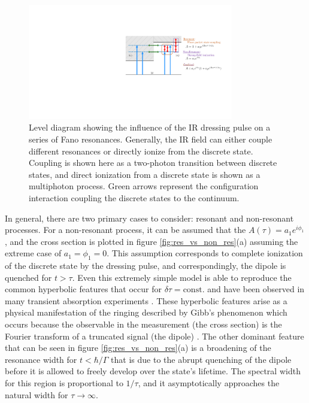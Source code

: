 \begin{figure}
	\centering
	\includegraphics[width=0.8\textwidth]{figures/ATS/level_diagram_dressing_3.pdf}
	\caption[Level diagram showing the influence of the IR dressing pulse on a series of Fano resonances]{Level diagram showing the influence of the IR dressing pulse on a series of Fano resonances. Generally, the IR field can either couple different resonances or directly ionize from the discrete state. Coupling is shown here as a two-photon transition between discrete states, and direct ionization from a discrete state is shown as a multiphoton process.  Green arrows represent the configuration interaction coupling the discrete states to the continuum.}
	\label{fig:level_diagram_dressing}
\end{figure}

In general, there are two primary cases to consider: resonant and non-resonant processes. For a non-resonant process, it can be assumed that the $A(\tau)=a_1e^{i\phi_1}$, and the cross section is plotted in figure \ref{fig:res_vs_non_res}(a) assuming the extreme case of $a_1=\phi_1=0$.  This assumption corresponds to complete ionization of the discrete state by the dressing pulse, and correspondingly, the dipole is quenched for $t>\tau$.  Even this extremely simple model is able to reproduce the common hyperbolic features that occur for $\delta\tau=\mathrm{const.}$ and have been observed in many transient absorption experiments \cite{wangAttosecondTimeResolvedAutoionization2010, ottReconstructionControlTimedependent2014, kaldunObservingUltrafastBuildup2016, wuTheoryStrongfieldAttosecond2016}.  These hyperbolic features arise as a physical manifestation of the ringing described by Gibb's phenomenon which occurs because the observable in the measurement (the cross section) is the Fourier transform of a truncated signal (the dipole) \cite{liInvestigationCouplingMechanisms2015, gibbsFourierSeries1898}. The other dominant feature that can be seen in figure  \ref{fig:res_vs_non_res}(a) is a broadening of the resonance width for $t<\hbar/\Gamma$ that is due to the abrupt quenching of the dipole before it is allowed to freely develop over the state's lifetime.  The spectral width for this region is proportional to $1/\tau$, and it asymptotically approaches the natural width for $\tau\rightarrow\infty$.

